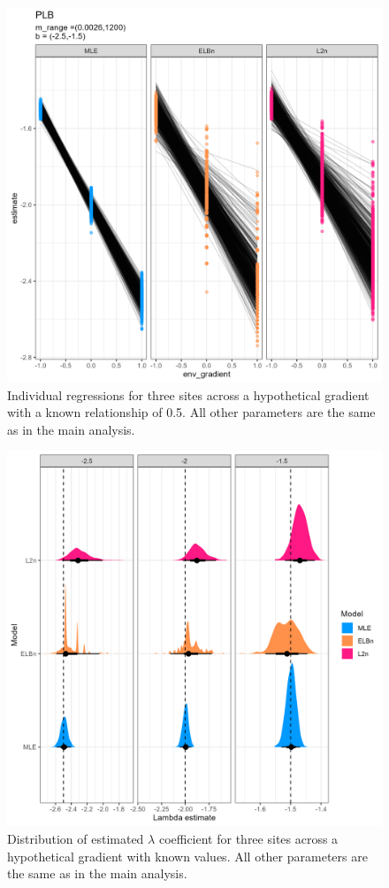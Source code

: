 \documentclass[
]{article}
\begin{document}
\begin{figure}
\centering
\includegraphics{figures/PLB_3_sites_main.png}
\caption{Individual regressions for three sites across a hypothetical
gradient with a known relationship of 0.5. All other parameters are the
same as in the main analysis.}
\end{figure}

\begin{figure}
\centering
\includegraphics{figures/PLB_3_sites_est_b_density.png}
\caption{Distribution of estimated \(\lambda\) coefficient for three
sites across a hypothetical gradient with known values. All other
parameters are the same as in the main analysis.}
\end{figure}
\end{document}
